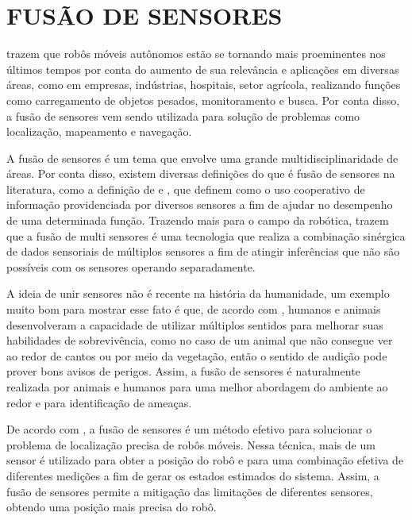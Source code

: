 \documentclass[acronym, symbols, table, deposito]{fei}
\begin{document}
	\section{FUSÃO DE SENSORES}
	
		\textcite{alatise2020review} trazem que robôs móveis autônomos estão se tornando mais proeminentes nos últimos tempos por conta do aumento de sua relevância e aplicações em diversas áreas, como em empresas, indústrias, hospitais, setor agrícola, realizando funções como carregamento de objetos pesados, monitoramento e busca. Por conta disso, a fusão de sensores vem sendo utilizada para solução de problemas como localização, mapeamento e navegação.
		
		A fusão de sensores é um tema que envolve uma grande multidisciplinaridade de áreas. Por conta disso, existem diversas definições do que é fusão de sensores na literatura, como a definição de \textcite{castanedo2013review} e \textcite{nagla2014multisensor}, que definem como o uso cooperativo de informação providenciada por diversos sensores a fim de ajudar no desempenho de uma determinada função. Trazendo mais para o campo da robótica, \textcite{luo2011multisensor} trazem que a fusão de multi sensores é uma tecnologia que realiza a combinação sinérgica de dados sensoriais de múltiplos sensores a fim de atingir inferências que não são possíveis com os sensores operando separadamente.
		
		A ideia de unir sensores não é recente na história da humanidade, um exemplo muito bom para mostrar esse fato é que, de acordo com \textcite{hall1997introduction}, humanos e animais desenvolveram a capacidade de utilizar múltiplos sentidos para melhorar suas habilidades de sobrevivência, como no caso de um animal que não consegue ver ao redor de cantos ou por meio da vegetação, então o sentido de audição pode prover bons avisos de perigos. Assim, a fusão de sensores é naturalmente realizada por animais e humanos para uma melhor abordagem do ambiente ao redor e para identificação de ameaças.
		
		De acordo com \textcite{marton2013two}, a fusão de sensores é um método efetivo para solucionar o problema de localização precisa de robôs móveis. Nessa técnica, mais de um sensor é utilizado para obter a posição do robô e para uma combinação efetiva de diferentes medições a fim de gerar os estados estimados do sistema. Assim, a fusão de sensores permite a mitigação das limitações de diferentes sensores, obtendo uma posição mais precisa do robô.
		
\end{document}
